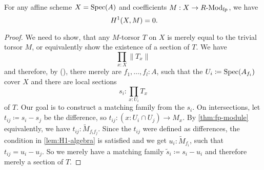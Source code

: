 \begin{theorem}
  For any affine scheme $X=\operatorname{Spec}(A)$ and coefficients $M: X\to R\text{-}\mathrm{Mod}_{\text{fp}}$, we have
  \[ H^1(X,M)=0 \rlap{.} \]
\end{theorem}
\begin{proof}
  We need to show, that any $M$-torsor $T$ on $X$ is merely equal to the trivial torsor $M$,
  or equivalently show the existence of a section of $T$.
  We have
  \[ \prod_{x:X}\| T_x \|\]
  and therefore, by (),
  there merely are $f_1,\dots,f_l:A$,
  such that the $U_i\coloneqq \operatorname{Spec}(A_{f_i})$ cover $X$ and
  there are local sections
  \[ s_i:\prod_{x:U_i}T_x\]
  of $T$. Our goal is to construct a matching family from the $s_i$.
  On intersections, let $t_{ij}\coloneqq s_i-s_j$ be the difference, so $t_{ij}:(x : U_i\cap U_j) \to M_x$.
  By \cref{thm:fp-module} equivalently, we have $t_{ij}:\tilde{M}_{f_i f_j}$.
  Since the $t_{ij}$ were defined as differences,
  the condition in \cref{lem:H1-algebra} is satisfied and we get
  $u_i:\tilde{M}_{f_i}$, such that $t_{ij}=u_i-u_j$.
  So we merely have a matching family $\tilde{s}_i\coloneqq s_i-u_i$ and therefore merely a section of $T$.
\end{proof}
